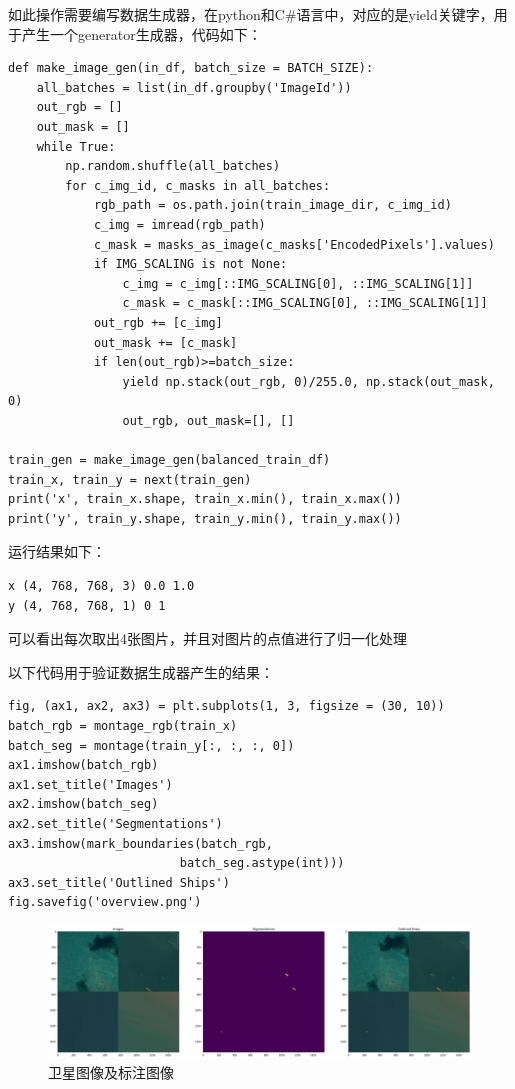 如此操作需要编写数据生成器，在python和C\#语言中，对应的是yield关键字，用于产生一个generator生成器，代码如下：

\begin{lstlisting}
def make_image_gen(in_df, batch_size = BATCH_SIZE):
    all_batches = list(in_df.groupby('ImageId'))
    out_rgb = []
    out_mask = []
    while True:
        np.random.shuffle(all_batches)
        for c_img_id, c_masks in all_batches:
            rgb_path = os.path.join(train_image_dir, c_img_id)
            c_img = imread(rgb_path)
            c_mask = masks_as_image(c_masks['EncodedPixels'].values)
            if IMG_SCALING is not None:
                c_img = c_img[::IMG_SCALING[0], ::IMG_SCALING[1]]
                c_mask = c_mask[::IMG_SCALING[0], ::IMG_SCALING[1]]
            out_rgb += [c_img]
            out_mask += [c_mask]
            if len(out_rgb)>=batch_size:
                yield np.stack(out_rgb, 0)/255.0, np.stack(out_mask, 0)
                out_rgb, out_mask=[], []

train_gen = make_image_gen(balanced_train_df)
train_x, train_y = next(train_gen)
print('x', train_x.shape, train_x.min(), train_x.max())
print('y', train_y.shape, train_y.min(), train_y.max())
\end{lstlisting}

运行结果如下：

\begin{lstlisting}
x (4, 768, 768, 3) 0.0 1.0
y (4, 768, 768, 1) 0 1
\end{lstlisting}

可以看出每次取出4张图片，并且对图片的点值进行了归一化处理

以下代码用于验证数据生成器产生的结果：

\begin{lstlisting}
fig, (ax1, ax2, ax3) = plt.subplots(1, 3, figsize = (30, 10))
batch_rgb = montage_rgb(train_x)
batch_seg = montage(train_y[:, :, :, 0])
ax1.imshow(batch_rgb)
ax1.set_title('Images')
ax2.imshow(batch_seg)
ax2.set_title('Segmentations')
ax3.imshow(mark_boundaries(batch_rgb, 
                        batch_seg.astype(int)))
ax3.set_title('Outlined Ships')
fig.savefig('overview.png')
\end{lstlisting}

\begin{figure}
\centering
\includegraphics[width=1\linewidth]{body/preprocessing_pic/6}
\caption{卫星图像及标注图像}
\label{fig::preprocessing6}
\end{figure}


